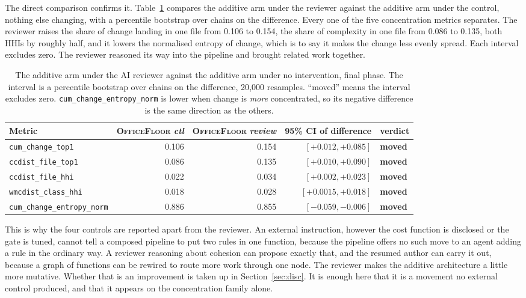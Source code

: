 \documentclass[11pt,a4paper]{article}
\newcommand{\offl}{\textsc{OfficeFloor}}
\begin{document}
The direct comparison confirms it. Table~\ref{tab:aiconverge} compares the
additive arm under the reviewer against the additive arm under the control,
nothing else changing, with a percentile bootstrap over chains on the
difference. Every one of the five concentration metrics separates. The reviewer
raises the share of change landing in one file from 0.106 to 0.154, the share of
complexity in one file from 0.086 to 0.135, both HHIs by roughly half, and it
lowers the normalised entropy of change, which is to say it makes the change less
evenly spread. Each interval excludes zero. The reviewer reasoned its way into
the pipeline and brought related work together.

\begin{table}[t]
\centering
\caption{The additive arm under the AI reviewer against the additive arm under no
intervention, final phase. The interval is a percentile bootstrap over chains on
the difference, 20{,}000 resamples. ``moved'' means the interval excludes zero.
\texttt{cum\_change\_entropy\_norm} is lower when change is \emph{more}
concentrated, so its negative difference is the same direction as the others.}
\label{tab:aiconverge}
\footnotesize
\setlength{\tabcolsep}{6pt}
\begin{tabular}{lrrrl}
\toprule
Metric & \offl{} \emph{ctl} & \offl{} \emph{review} & 95\% CI of difference & verdict \\
\midrule
\texttt{cum\_change\_top1} & 0.106 & 0.154 & $[+0.012, +0.085]$ & \textbf{moved} \\
\texttt{ccdist\_file\_top1} & 0.086 & 0.135 & $[+0.010, +0.090]$ & \textbf{moved} \\
\texttt{ccdist\_file\_hhi} & 0.022 & 0.034 & $[+0.002, +0.023]$ & \textbf{moved} \\
\texttt{wmcdist\_class\_hhi} & 0.018 & 0.028 & $[+0.0015, +0.018]$ & \textbf{moved} \\
\texttt{cum\_change\_entropy\_norm} & 0.886 & 0.855 & $[-0.059, -0.006]$ & \textbf{moved} \\
\bottomrule
\end{tabular}
\end{table}

This is why the four controls are reported apart from the reviewer. An external
instruction, however the cost function is disclosed or the gate is tuned, cannot
tell a composed pipeline to put two rules in one function, because the pipeline
offers no such move to an agent adding a rule in the ordinary way. A reviewer
reasoning about cohesion can propose exactly that, and the resumed author can
carry it out, because a graph of functions can be rewired to route more work
through one node. The reviewer makes the additive architecture a little more
mutative. Whether that is an improvement is taken up in Section~\ref{sec:disc}.
It is enough here that it is a movement no external control produced, and that it
appears on the concentration family alone.
\end{document}
